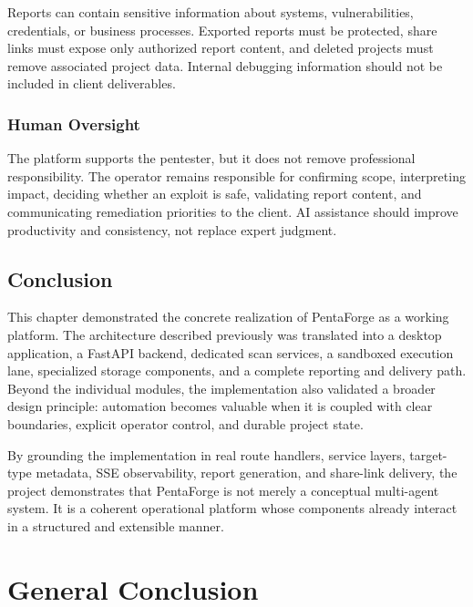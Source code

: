 \documentclass[12pt,a4paper]{report}
\begin{document}
Reports can contain sensitive information about systems, vulnerabilities, credentials,
or business processes. Exported reports must be protected, share links must expose only
authorized report content, and deleted projects must remove associated project data.
Internal debugging information should not be included in client deliverables.

\subsection*{Human Oversight}

The platform supports the pentester, but it does not remove professional responsibility.
The operator remains responsible for confirming scope, interpreting impact, deciding
whether an exploit is safe, validating report content, and communicating remediation
priorities to the client. AI assistance should improve productivity and consistency,
not replace expert judgment.

\section*{Conclusion}

This chapter demonstrated the concrete realization of PentaForge as a working
platform. The architecture described previously was translated into a desktop
application, a FastAPI backend, dedicated scan services, a sandboxed execution lane,
specialized storage components, and a complete reporting and delivery path. Beyond
the individual modules, the implementation also validated a broader design principle:
automation becomes valuable when it is coupled with clear boundaries, explicit
operator control, and durable project state.

By grounding the implementation in real route handlers, service layers, target-type
metadata, SSE observability, report generation, and share-link delivery, the project
demonstrates that PentaForge is not merely a conceptual multi-agent system. It is a
coherent operational platform whose components already interact in a structured and
extensible manner.

\newpage
\thispagestyle{fancy}
\chapter*{General Conclusion}
\end{document}
